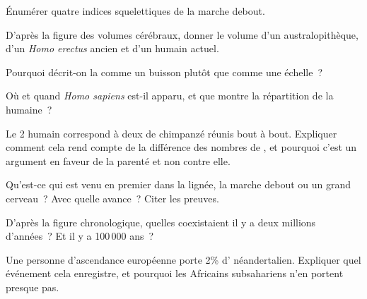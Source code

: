 \begin{exercise}[$\star$]\label{exo:g12:human-evolution:2}
Énumérer quatre indices squelettiques de la marche debout.
\end{exercise}

\begin{exercise}[$\star$]\label{exo:g12:human-evolution:3}
D'après la figure des volumes cérébraux, donner le volume d'un
australopithèque, d'un \emph{Homo erectus} ancien et d'un humain
actuel.
\end{exercise}

\begin{exercise}[$\star$]\label{exo:g12:human-evolution:4}
Pourquoi décrit-on la  comme un buisson plutôt que comme
une échelle~?
\end{exercise}

\begin{exercise}[$\star$]\label{exo:g12:human-evolution:5}
Où et quand \emph{Homo sapiens} est-il apparu, et que montre la
répartition de la  humaine~?
\end{exercise}

\begin{exercise}[$\star\star$]\label{exo:g12:human-evolution:6}
Le  2 humain correspond à deux  de chimpanzé
réunis bout à bout. Expliquer comment cela rend compte de la
différence des nombres de , et pourquoi c'est un argument
en faveur de la parenté et non contre elle.
\end{exercise}

\begin{exercise}[$\star\star$]\label{exo:g12:human-evolution:7}
Qu'est-ce qui est venu en premier dans la lignée, la marche debout ou
un grand cerveau~? Avec quelle avance~? Citer les preuves.
\end{exercise}

\begin{exercise}[$\star\star$]\label{exo:g12:human-evolution:8}
D'après la figure chronologique, quelles  coexistaient il y a
deux millions d'années~? Et il y a 100\,000 ans~?
\end{exercise}

\begin{exercise}[$\star\star$]\label{exo:g12:human-evolution:9}
Une personne d'ascendance européenne porte 2\% d' néandertalien.
Expliquer quel événement cela enregistre, et pourquoi les Africains
subsahariens n'en portent presque pas.
\end{exercise}

